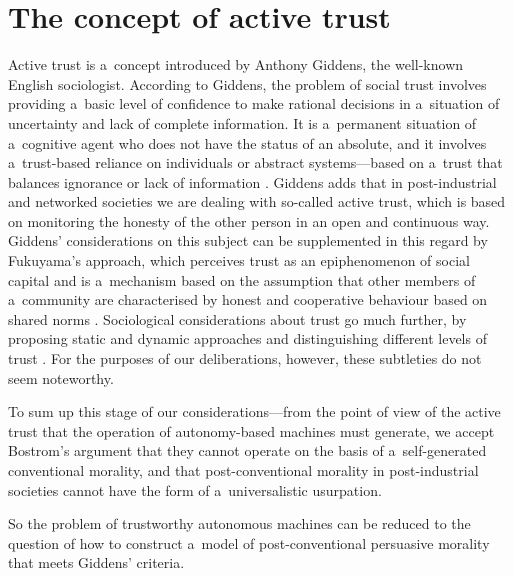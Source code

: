 \section*{The concept of active trust}
Active trust is a~concept introduced by Anthony Giddens, the well-known English sociologist. According to Giddens, the problem of social trust involves providing a~basic level of confidence to make rational decisions in a~situation of uncertainty and lack of complete information. It is a~permanent situation of a~cognitive agent who does not have the status of an absolute, and it involves a~trust-based reliance on individuals or abstract systems—based on a~trust that balances ignorance or lack of information
\parencite[][p.318]{giddens_modernity_1991}. %
 Giddens adds that in post-industrial and networked societies we are dealing with so-called active trust, which is based on monitoring the honesty of the other person in an open and continuous way. Giddens' considerations on this subject can be supplemented in this regard by Fukuyama's approach, which perceives trust as an epiphenomenon of social capital and is a~mechanism based on the assumption that other members of a~community are characterised by honest and cooperative behaviour based on shared norms 
\parencite[][p.38]{fukuyama_trust_1995}. %
 Sociological considerations about trust go much further, by proposing static and dynamic approaches and distinguishing different levels of trust 
\parencite[][pp.85–86]{milaszewicz_zaufanie_2016}. %
 For the purposes of our deliberations, however, these subtleties do not seem noteworthy.

To sum up this stage of our considerations—from the point of view of the active trust that the operation of autonomy-based machines must generate, we accept Bostrom's argument that they cannot operate on the basis of a~self-generated conventional morality, and that post-conventional morality in post-industrial societies cannot have the form of a~universalistic usurpation.

So the problem of trustworthy autonomous machines can be reduced to the question of how to construct a~model of post-conventional persuasive morality that meets Giddens' criteria.

